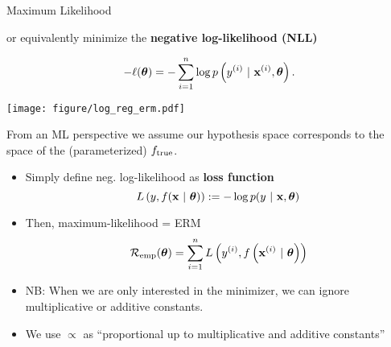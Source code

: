 \documentclass[11pt,compress,t,notes=noshow, xcolor=table]{beamer}
\begin{document}
\begin{vbframe}{Maximum Likelihood}
\begin{itemize}
or equivalently minimize the \textbf{negative log-likelihood (NLL)}

\begin{minipage}{0.5\textwidth}
$$ -\ell(\bm{\theta}) = -\sum\limits_{i=1}^n \log p\left(y^{(i)} ~|~\mathbf{x}^{(i)}, \bm{\theta}\right). $$
\end{minipage}%
\begin{minipage}{0.5\textwidth}
\texttt{[image: figure/log\_reg\_erm.pdf]}
\end{minipage}
\end{itemize}


\framebreak 

From an ML perspective we assume our hypothesis space corresponds to the space of the (parameterized) $f_{\text{true}}$. 

\begin{itemize}
\item Simply define neg. log-likelihood as \textbf{loss function} 
$$ L\left(y, f(\mathbf{x} ~|~ \bm{\theta})\right) := - \log p(y ~|~\mathbf{x}, \bm{\theta}) $$
\item Then, maximum-likelihood 
 = ERM
$$\mathcal{R}_{\text{emp}}(\bm{\theta}) = \sum\limits_{i=1}^n L\left(y^{(i)}, f\left(\mathbf{x}^{(i)} ~|~ \bm{\theta}\right)\right)$$

\item NB: When we are only interested in the minimizer, we can ignore multiplicative or additive constants.
\item We use $\propto$ as \enquote{proportional up to multiplicative and additive constants}

\end{itemize}

\end{vbframe}
\end{document}
